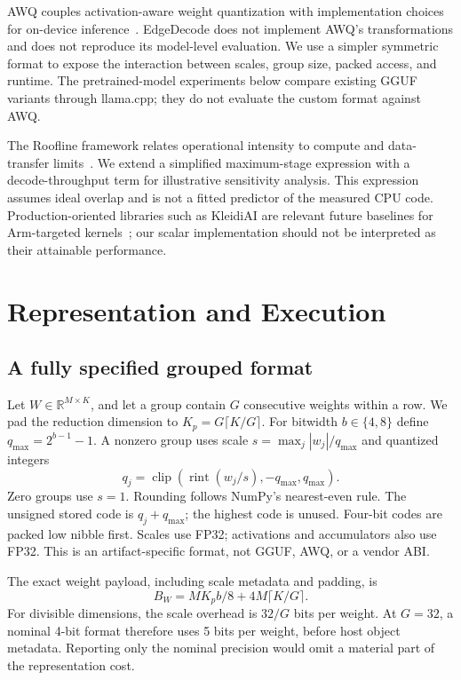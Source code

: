 \documentclass[11pt]{article}
\begin{document}
AWQ couples activation-aware weight quantization with implementation choices for
on-device inference~\cite{awq}. EdgeDecode does not implement AWQ's transformations
and does not reproduce its model-level evaluation. We use a simpler symmetric
format to expose the interaction between scales, group size, packed access, and
runtime. The pretrained-model experiments below compare existing GGUF variants through
llama.cpp; they do not evaluate the custom format against AWQ.

The Roofline framework relates operational intensity to compute and data-transfer
limits~\cite{roofline}. We extend a simplified maximum-stage expression with a
decode-throughput term for illustrative sensitivity analysis. This expression
assumes ideal overlap and is not a fitted predictor of the measured CPU code.
Production-oriented libraries such as KleidiAI are relevant future baselines for
Arm-targeted kernels~\cite{kleidiai}; our scalar implementation should not be
interpreted as their attainable performance.

\section{Representation and Execution}
\subsection{A fully specified grouped format}
Let $W\in\mathbb{R}^{M\times K}$, and let a group contain $G$ consecutive weights
within a row. We pad the reduction dimension to
$K_p=G\lceil K/G\rceil$. For bitwidth $b\in\{4,8\}$ define
$q_{\max}=2^{b-1}-1$. A nonzero group uses scale
$s=\max_j|w_j|/q_{\max}$ and quantized integers
\begin{equation}
q_j=\operatorname{clip}\!\left(\operatorname{rint}(w_j/s),
-q_{\max},q_{\max}\right).
\end{equation}
Zero groups use $s=1$. Rounding follows NumPy's nearest-even rule. The unsigned
stored code is $q_j+q_{\max}$; the highest code is unused. Four-bit codes are
packed low nibble first. Scales use FP32; activations and accumulators also use
FP32. This is an artifact-specific format, not GGUF, AWQ, or a vendor ABI.

The exact weight payload, including scale metadata and padding, is
\begin{equation}
B_W=M K_p b/8+4M\lceil K/G\rceil.
\label{eq:bytes}
\end{equation}
For divisible dimensions, the scale overhead is $32/G$ bits per weight. At
$G=32$, a nominal 4-bit format therefore uses 5 bits per weight, before host object
metadata. Reporting only the nominal precision would omit a material part of the
representation cost.
\end{document}

